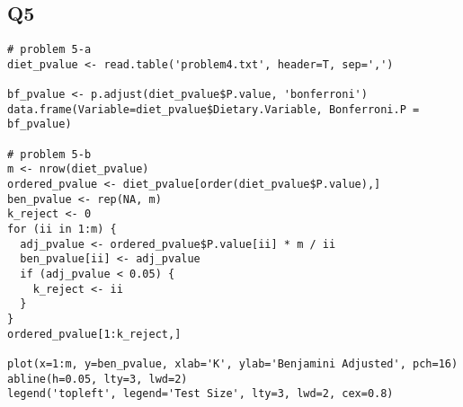 \documentclass[11pt,letterpaper]{article}
\begin{document}
\subsection*{Q5}
\begin{verbatim}
# problem 5-a
diet_pvalue <- read.table('problem4.txt', header=T, sep=',')

bf_pvalue <- p.adjust(diet_pvalue$P.value, 'bonferroni')
data.frame(Variable=diet_pvalue$Dietary.Variable, Bonferroni.P = bf_pvalue)

# problem 5-b
m <- nrow(diet_pvalue)
ordered_pvalue <- diet_pvalue[order(diet_pvalue$P.value),]
ben_pvalue <- rep(NA, m)
k_reject <- 0
for (ii in 1:m) { 
  adj_pvalue <- ordered_pvalue$P.value[ii] * m / ii
  ben_pvalue[ii] <- adj_pvalue
  if (adj_pvalue < 0.05) {
    k_reject <- ii
  }
}
ordered_pvalue[1:k_reject,]

plot(x=1:m, y=ben_pvalue, xlab='K', ylab='Benjamini Adjusted', pch=16)
abline(h=0.05, lty=3, lwd=2)
legend('topleft', legend='Test Size', lty=3, lwd=2, cex=0.8)
\end{verbatim}
\end{document}
